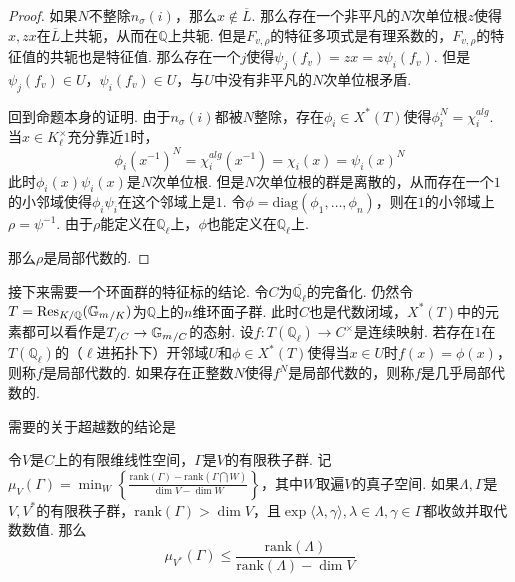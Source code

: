 \begin{proof}
    如果$N$不整除$n_{\sigma}(i)$，那么$x\not\in \overline{L}$. 那么存在一个非平凡的$N$次单位根$z$使得$x, zx$在$\overline{L}$上共轭，从而在$\mathbb{Q}$上共轭. 但是$F_{v,\rho}$的特征多项式是有理系数的，$F_{v,\rho}$的特征值的共轭也是特征值. 那么存在一个$j$使得$\psi_j(f_v) = zx = z\psi_i(f_v)$. 但是$\psi_j(f_v)\in U$，$\psi_i(f_v)\in U$，与$U$中没有非平凡的$N$次单位根矛盾.

    \vskip0.3cm

    回到命题本身的证明. 由于$n_{\sigma}(i)$都被$N$整除，存在$\phi_i\in X^{*}(T)$使得$\phi_i^N = \chi_i^{alg}$. 当$x\in K_{\ell}^{\times}$充分靠近$1$时，
    \begin{equation}
        \phi_i(x^{-1})^N = \chi_i^{alg}(x^{-1}) = \chi_i(x) = \psi_i(x)^N
    \end{equation}
    此时$\phi_i(x)\psi_i(x)$是$N$次单位根. 但是$N$次单位根的群是离散的，从而存在一个$1$的小邻域使得$\phi_i\psi_i$在这个邻域上是$1$. 令$\phi=\mathrm{diag}(\phi_1,\ldots,\phi_n)$，则在$1$的小邻域上$\rho = \psi^{-1}$. 由于$\rho$能定义在$\mathbb{Q}_{\ell}$上，$\phi$也能定义在$\mathbb{Q}_{\ell}$上.

    那么$\rho$是局部代数的.
\end{proof}

接下来需要一个环面群的特征标的结论.
令$C$为$\overline{\mathbb{Q}_{\ell}}$的完备化. 仍然令$T=\mathrm{Res}_{K/\mathbb{Q}}({\mathbb{G}_m}_{/K})$为$\mathbb{Q}$上的$n$维环面子群. 此时$C$也是代数闭域，$X^{*}(T)$中的元素都可以看作是${T}_{/C}\to {\mathbb{G}_m}_{/C}$的态射.
设$f: T(\mathbb{Q}_{\ell})\to C^{\times}$是连续映射. 若存在$1$在$T(\mathbb{Q}_{\ell})$的（$\ell$进拓扑下）开邻域$U$和$\phi\in X^{*}(T)$使得当$x\in U$时$f(x)=\phi(x)$，则称$f$是局部代数的. 如果存在正整数$N$使得$f^N$是局部代数的，则称$f$是几乎局部代数的.

需要的关于超越数的结论是
\begin{cprop}
    令$V$是$C$上的有限维线性空间，$\Gamma$是$V$的有限秩子群. 记$\mu_{V}(\Gamma) = \min_W \left\{ \frac{\mathrm{rank}(\Gamma) - \mathrm{rank}(\Gamma \bigcap W)}{\dim V-\dim W} \right\}$，其中$W$取遍$V$的真子空间. 如果$\Lambda, \Gamma$是$V, V^{*}$的有限秩子群，$\mathrm{rank}(\Gamma)>\dim V$，且$\exp\langle \lambda, \gamma\rangle, \lambda \in \Lambda, \gamma\in \Gamma$都收敛并取代数数值. 那么
    \begin{equation}
        \mu_{V^{*}}(\Gamma)\leq \frac{\mathrm{rank}(\Lambda)}{\mathrm{rank}(\Lambda) - \dim V}
    \end{equation}\label{temp::theo8}
\end{cprop}

